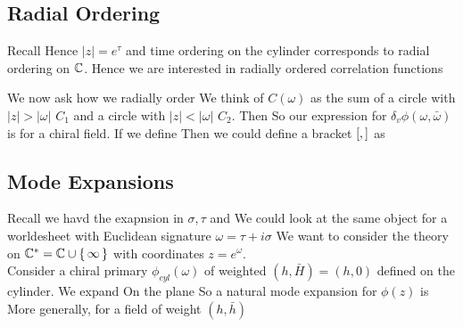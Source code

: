 \documentclass{article}
\begin{document}
\subsection{Radial Ordering}
Recall 
Hence $|z| = e^\tau$ and time ordering on the cylinder corresponds to radial ordering on $\mathbb{C}$. Hence we are interested in radially ordered correlation functions 
\begin{definition}
\end{definition}
We now ask how we radially order 
We think of $C(\omega)$ as the sum of a circle with $|z| > |\omega|$ $C_1$ and a circle with $|z| < |\omega|$ $C_2$. Then 
So our expression for $\delta_v \phi(\omega,\bar{\omega})$ is 
for a chiral field. If we define 
Then we could define a bracket $\left[ ,  \right]$ as 

\subsection{Mode Expansions}
Recall we havd the exapnsion in $\sigma,\tau$ 
and 
We could look at the same object for a worldesheet with Euclidean signature $\omega = \tau + i \sigma $
We want to consider the theory on $\mathbb{C}^\ast = \mathbb{C} \cup \set{\infty}$ with coordinates $z = e^\omega$. \\
Consider a chiral primary $\phi_{cyl}(\omega)$ of weighted $(h,\bar{H}) = (h,0)$ defined on the cylinder. We expand 
On the plane 
So a natural mode expansion for $\phi(z)$ is 
More generally, for a field of weight $(h,\bar{h})$
\end{document}
